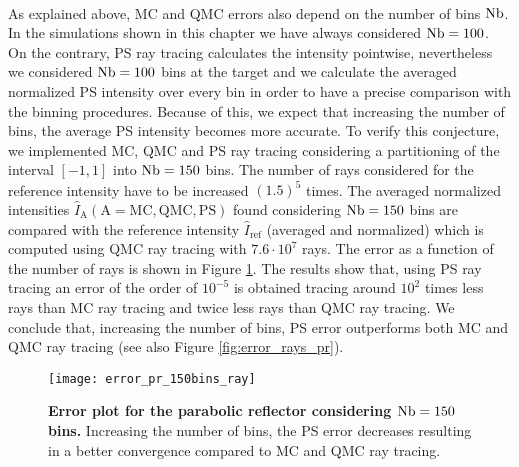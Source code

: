 \\ \indent As explained above, MC and QMC errors also depend on the number of bins $\textrm{Nb}$. In the simulations shown in this chapter we have always considered $\textrm{Nb} = 100$. On the contrary, PS ray tracing calculates the intensity pointwise, nevertheless we considered $\textrm{Nb} = 100$ bins at the target and we calculate the averaged normalized PS intensity over every bin in order to have a precise comparison with the binning procedures. Because of this, we expect that increasing the number of bins, the average PS intensity becomes more accurate. To verify this conjecture, we implemented MC, QMC and PS ray tracing considering a partitioning of the interval $[-1,1]$ into $\textrm{Nb} = 150$ bins. The number of rays considered for the reference intensity have to be increased $(1.5)^5$ times. The averaged normalized intensities $\hat{I}_{\textrm{A}} (\textrm{A}=\textrm{MC}, \textrm{QMC}, \textrm{PS})$ found considering $\textrm{Nb}=150$ bins are compared with the reference intensity $\hat{I}_{\textrm{ref}}$ (averaged and normalized) which is computed using QMC ray tracing with $7.6\cdot10^7$ rays. The error as a function of the number of rays is shown in Figure \ref{fig:error_pr_150_bin}. The results show that, using PS ray tracing an error of the order of $10^{-5}$ is obtained tracing around $10^2$ times less rays than MC ray tracing and twice less rays than QMC ray tracing. We conclude that, increasing the number of bins, PS error outperforms both MC and QMC ray tracing (see also Figure \ref{fig:error_rays_pr}).
\begin{figure}[h]
  \center
  \texttt{[image: error\_pr\_150bins\_ray]}
  \caption{\textbf{Error plot for the parabolic reflector considering $\textrm{Nb}=150$ bins.} Increasing the number of bins, the PS error decreases resulting in a better convergence compared to MC and QMC ray tracing.}
  \label{fig:error_pr_150_bin}
\end{figure}
